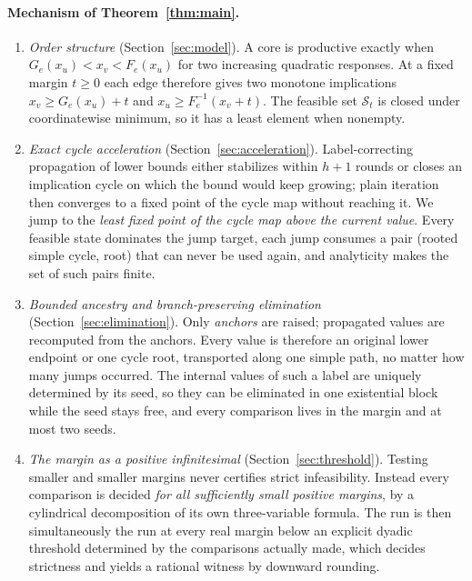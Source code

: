 \documentclass[11pt,a4paper]{article}
\theoremstyle{plain}
\theoremstyle{definition}
\theoremstyle{remark}
\newcommand{\St}{\mathcal{S}_t}
\begin{document}
\paragraph{Mechanism of Theorem~\ref{thm:main}.}
\begin{enumerate}[label=(\roman*)]
\item \emph{Order structure} (Section~\ref{sec:model}). A core is productive exactly when $G_e(x_u)<x_v<F_e(x_u)$ for two increasing quadratic responses. At a fixed margin $t\ge0$ each edge therefore gives two monotone implications $x_v\ge G_e(x_u)+t$ and $x_u\ge F_e^{-1}(x_v+t)$. The feasible set $\St$ is closed under coordinatewise minimum, so it has a least element when nonempty.
\item \emph{Exact cycle acceleration} (Section~\ref{sec:acceleration}). Label-correcting propagation of lower bounds either stabilizes within $h+1$ rounds or closes an implication cycle on which the bound would keep growing; plain iteration then converges to a fixed point of the cycle map without reaching it. We jump to the \emph{least fixed point of the cycle map above the current value}. Every feasible state dominates the jump target, each jump consumes a pair (rooted simple cycle, root) that can never be used again, and analyticity makes the set of such pairs finite.
\item \emph{Bounded ancestry and branch-preserving elimination} (Section~\ref{sec:elimination}). Only \emph{anchors} are raised; propagated values are recomputed from the anchors. Every value is therefore an original lower endpoint or one cycle root, transported along one simple path, no matter how many jumps occurred. The internal values of such a label are uniquely determined by its seed, so they can be eliminated in one existential block while the seed stays free, and every comparison lives in the margin and at most two seeds.
\item \emph{The margin as a positive infinitesimal} (Section~\ref{sec:threshold}). Testing smaller and smaller margins never certifies strict infeasibility. Instead every comparison is decided \emph{for all sufficiently small positive margins}, by a cylindrical decomposition of its own three-variable formula. The run is then simultaneously the run at every real margin below an explicit dyadic threshold determined by the comparisons actually made, which decides strictness and yields a rational witness by downward rounding.
\end{enumerate}
\end{document}
